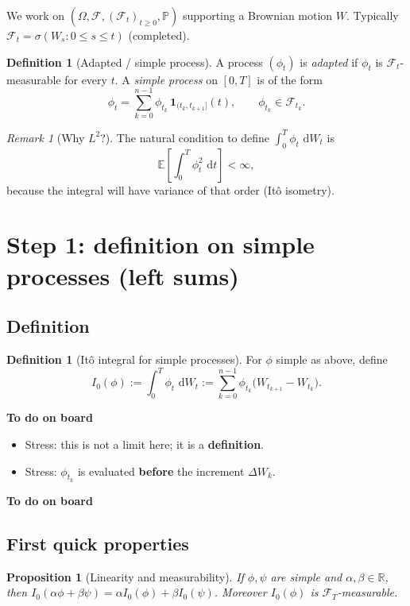 \documentclass[11pt]{article}
\newcommand{\Pbb}{\mathbb{P}}
\newcommand{\E}{\mathbb{E}}
\newcommand{\R}{\mathbb{R}}
\newcommand{\F}{\mathcal{F}}
\newcommand{\1}{\mathbf{1}}
\newcommand{\dd}{\,\mathrm{d}}
\numberwithin{equation}{section}
\theoremstyle{plain}
\newtheorem{proposition}[theorem]{Proposition}
\theoremstyle{definition}
\newtheorem{definition}[theorem]{Definition}
\theoremstyle{remark}
\newtheorem{remark}[theorem]{Remark}
\begin{document}
We work on $(\Omega,\F,(\F_t)_{t\ge0},\Pbb)$ supporting a Brownian motion $W$.
Typically $\F_t=\sigma(W_s:0\le s\le t)$ (completed).

\begin{definition}[Adapted / simple process]
A process $(\phi_t)$ is \emph{adapted} if $\phi_t$ is $\F_t$-measurable for every $t$.
A \emph{simple process} on $[0,T]$ is of the form
\[
\phi_t=\sum_{k=0}^{n-1}\phi_{t_k}\,\1_{(t_k,t_{k+1}]}(t),
\qquad \phi_{t_k}\in\F_{t_k}.
\]
\end{definition}

\begin{remark}[Why $L^2$?]
The natural condition to define $\int_0^T \phi_t\,\dd W_t$ is
\[
\E\!\left[\int_0^T \phi_t^2\,\dd t\right]<\infty,
\]
because the integral will have variance of that order (It\^o isometry).
\end{remark}

\section{Step 1: definition on simple processes (left sums)}

\subsection{Definition}

\begin{definition}[It\^o integral for simple processes]
For $\phi$ simple as above, define
\[
I_0(\phi):=\int_0^T \phi_t\,\dd W_t
:=\sum_{k=0}^{n-1}\phi_{t_k}\big(W_{t_{k+1}}-W_{t_k}\big).
\]
\end{definition}

\textbf{To do on board}
\begin{itemize}
  \item Stress: this is not a limit here; it is a \textbf{definition}.
  \item Stress: $\phi_{t_k}$ is evaluated \textbf{before} the increment $\Delta W_k$.
\end{itemize}
\textbf{To do on board}

\subsection{First quick properties}
\begin{proposition}[Linearity and measurability]
If $\phi,\psi$ are simple and $\alpha,\beta\in\R$, then
$I_0(\alpha\phi+\beta\psi)=\alpha I_0(\phi)+\beta I_0(\psi)$.
Moreover $I_0(\phi)$ is $\F_T$-measurable.
\end{proposition}
\end{document}
